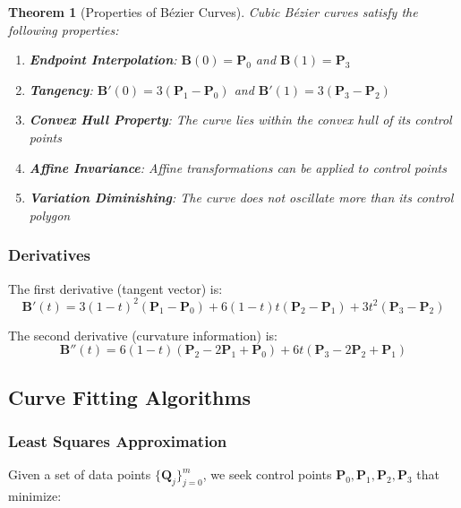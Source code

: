 \documentclass[12pt,a4paper]{article}
\newtheorem{theorem}{Theorem}
\begin{document}
\begin{theorem}[Properties of Bézier Curves]
Cubic Bézier curves satisfy the following properties:
\begin{enumerate}
    \item \textbf{Endpoint Interpolation}: $\mathbf{B}(0) = \mathbf{P}_0$ and $\mathbf{B}(1) = \mathbf{P}_3$
    \item \textbf{Tangency}: $\mathbf{B}'(0) = 3(\mathbf{P}_1 - \mathbf{P}_0)$ and $\mathbf{B}'(1) = 3(\mathbf{P}_3 - \mathbf{P}_2)$
    \item \textbf{Convex Hull Property}: The curve lies within the convex hull of its control points
    \item \textbf{Affine Invariance}: Affine transformations can be applied to control points
    \item \textbf{Variation Diminishing}: The curve does not oscillate more than its control polygon
\end{enumerate}
\end{theorem}

\subsubsection{Derivatives}

The first derivative (tangent vector) is:
\begin{equation}
\mathbf{B}'(t) = 3(1-t)^2(\mathbf{P}_1-\mathbf{P}_0) + 6(1-t)t(\mathbf{P}_2-\mathbf{P}_1) + 3t^2(\mathbf{P}_3-\mathbf{P}_2)
\end{equation}

The second derivative (curvature information) is:
\begin{equation}
\mathbf{B}''(t) = 6(1-t)(\mathbf{P}_2-2\mathbf{P}_1+\mathbf{P}_0) + 6t(\mathbf{P}_3-2\mathbf{P}_2+\mathbf{P}_1)
\end{equation}

\subsection{Curve Fitting Algorithms}

\subsubsection{Least Squares Approximation}

Given a set of data points $\{\mathbf{Q}_j\}_{j=0}^{m}$, we seek control points $\mathbf{P}_0, \mathbf{P}_1, \mathbf{P}_2, \mathbf{P}_3$ that minimize:
\end{document}
